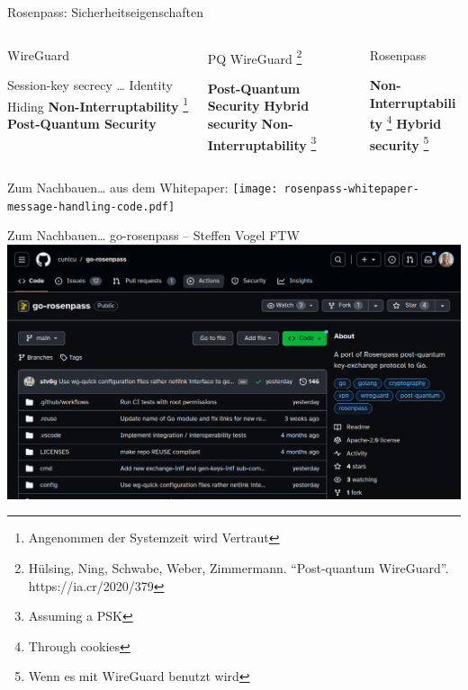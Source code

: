 \documentclass[german]{rosenpass-beamer}
\newcommand*{\heading}[1]{%
  {
    \hspace*{-0.5cm}#1
    \vspace{1.0em}
  }
}
\begin{document}
\begin{frame}{Rosenpass: Sicherheitseigenschaften}

\vspace{0.5em}
\begin{columns}[t]
\begin{column}{.30\textwidth}
\heading{WireGuard}
\begin{itemize}
  \itemtick Session-key secrecy
  \itemtick \dots
  \itemtick Identity Hiding
  \itemfail \textbf{Non-Interruptability} \footnote[frame]{Angenommen der Systemzeit wird Vertraut}
  \itemfail \textbf{Post-Quantum Security}
\end{itemize}
\end{column}

\begin{column}{.30\textwidth}
\heading{
  PQ WireGuard
  \footnote[frame]{
	  Hülsing, Ning, Schwabe, Weber, Zimmermann. “Post-quantum WireGuard”. https://ia.cr/2020/379
	}
}
\begin{itemize}
  \itemtick \textbf{Post-Quantum Security}
  \itemfail \textbf{Hybrid security}
  \itemfail \textbf{Non-Interruptability} \footnote[frame]{Assuming a PSK}
\end{itemize}
\end{column}

\begin{column}{.30\textwidth}
\heading{Rosenpass}
\begin{itemize}
  \itemtick \textbf{Non-Interruptability} \footnote[frame]{Through cookies}
  \itemtick \textbf{Hybrid security} \footnote[frame]{Wenn es mit WireGuard benutzt wird}
\end{itemize}
\end{column}

\end{columns}
\vspace{1.5em}

\end{frame}

\begin{frame}{Zum Nachbauen… aus dem Whitepaper:}
  \texttt{[image: rosenpass-whitepaper-message-handling-code.pdf]}
\end{frame}

\begin{frame}{Zum Nachbauen… go-rosenpass – Steffen Vogel FTW}
  \includegraphics[height=.9\textheight]{assets/2023-09-02-go-rosenpass-gh.png}
\end{frame}
\end{document}
